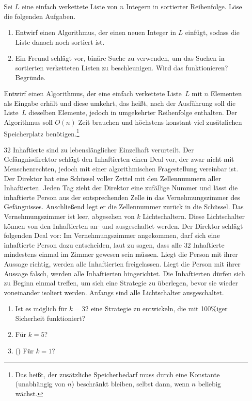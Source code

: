 \documentclass{uebung_cs}
\begin{document}
\begin{aufgabe}
	Sei $L$ eine einfach verkettete Liste von $n$ Integern in sortierter Reihenfolge.
	Löse die folgenden Aufgaben.
	\begin{enumerate}
		\item Entwirf einen Algorithmus, der einen neuen Integer in $L$ einfügt, sodass die Liste danach noch sortiert ist.
		\item Ein Freund schlägt vor, binäre Suche zu verwenden, um das Suchen in sortierten verketteten Listen zu beschleunigen. Wird das funktionieren? Begründe.
	\end{enumerate}
\end{aufgabe}

\begin{aufgabe}
	Entwirf einen Algorithmus, der eine einfach verkettete Liste~$L$ mit $n$ Elementen als Eingabe erhält und diese umkehrt, das heißt, nach der Ausführung soll die Liste~$L$ dieselben Elemente, jedoch in umgekehrter Reihenfolge enthalten.
	Der Algorithmus soll $O(n)$ Zeit brauchen und höchstens konstant viel zusätzlichen Speicherplatz benötigen.\footnote{Das heißt, der zusätzliche Speicherbedarf muss durch eine Konstante (unabhängig von $n$) beschränkt bleiben, selbst dann, wenn $n$ beliebig wächst.}
\end{aufgabe}

\begin{aufgabe}
	32 Inhaftierte sind zu lebenslänglicher Einzelhaft verurteilt.
	Der Gefängnisdirektor schlägt den Inhaftierten einen Deal vor, der zwar nicht mit Menschenrechten, jedoch mit einer algorithmischen Fragestellung vereinbar ist.
	Der Direktor hat eine Schüssel voller Zettel mit den Zellennummern aller Inhaftierten.
	Jeden Tag zieht der Direktor eine zufällige Nummer und lässt die inhaftierte Person aus der entsprechenden Zelle in das Vernehmungszimmer des Gefängnisses. Anschließend legt er die Zellennummer zurück in die Schüssel.
	Das Vernehmungszimmer ist leer, abgesehen von $k$ Lichtschaltern.
	Diese Lichtschalter können von den Inhaftierten an- und ausgeschaltet werden.
	Der Direktor schlägt folgenden Deal vor:
	Im Vernehmungszimmer angekommen, darf sich eine inhaftierte Person dazu entscheiden, laut zu sagen, dass alle 32 Inhaftierte mindestens einmal im Zimmer gewesen sein müssen.
	Liegt die Person mit ihrer Aussage richtig, werden alle Inhaftierten freigelassen.
	Liegt die Person mit ihrer Aussage falsch, werden alle Inhaftierten hingerichtet.
	Die Inhaftierten dürfen sich zu Beginn einmal treffen, um sich eine Strategie zu überlegen, bevor sie wieder voneinander isoliert werden.
	Anfangs sind alle Lichtschalter ausgeschaltet.
	
	\begin{enumerate}
		\item Ist es möglich für $k=32$ eine Strategie zu entwickeln, die mit 100\%iger Sicherheit funktioniert?
		\item Für $k=5$?
		\item (\veryhard) Für $k=1$?
	\end{enumerate}
\end{aufgabe}
\end{document}
